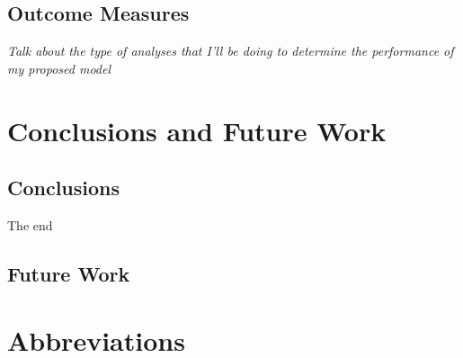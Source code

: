 \documentclass[a4paper,twoside,phd]{BYUPhys}
\begin{document}
\section{Outcome Measures}
\label{sec:OutcomeMeasures}
\textit{Talk about the type of analyses that I'll be doing to determine the performance of my proposed model}

\chapter{Conclusions and Future Work}
\label{chap:Conclusions}


\section{Conclusions}
\label{sec:ConclusionsConclusions}

The end

\section{Future Work}
\label{FutureWork}



\clearemptydoublepage
\chapter{Abbreviations}
\label{chap:abbreviations}
\end{document}
